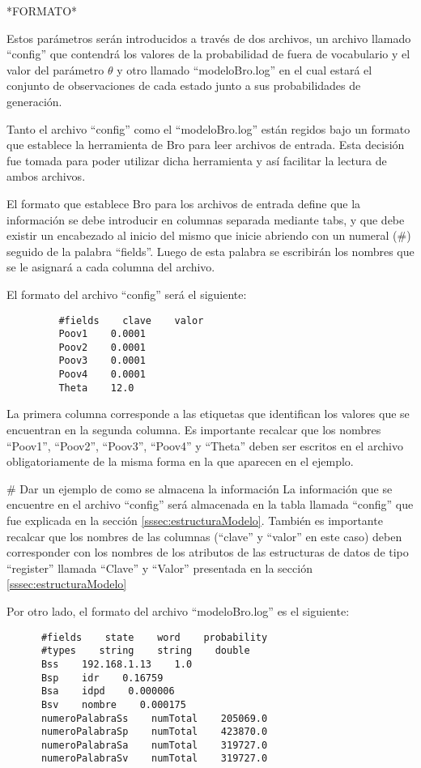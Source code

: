     *FORMATO*

Estos parámetros serán introducidos a través de dos archivos, un archivo llamado “config” que contendrá los valores de la probabilidad de fuera de vocabulario y el valor del parámetro $\theta$ y otro llamado “modeloBro.log” en el cual estará el conjunto de observaciones de cada estado junto a sus probabilidades de generación.

Tanto el archivo “config” como el “modeloBro.log” están regidos bajo un formato que establece la herramienta de Bro para leer archivos de entrada. Esta decisión fue tomada para poder utilizar dicha herramienta y así facilitar la lectura de ambos archivos.

El formato que establece Bro para los archivos de entrada define que la información se debe introducir en columnas separada mediante tabs, y que debe existir un encabezado al inicio del mismo que inicie abriendo con un numeral (\#) seguido de la palabra “fields”. Luego de esta palabra se escribirán los nombres que se le asignará a cada columna del archivo.

El formato del archivo “config” será el siguiente:

\begin{verbatim}
         #fields    clave    valor
         Poov1    0.0001
         Poov2    0.0001
         Poov3    0.0001
         Poov4    0.0001
         Theta    12.0
\end{verbatim}

La primera columna corresponde a las etiquetas que identifican los valores que se encuentran en la segunda columna. Es importante recalcar que los nombres “Poov1”, “Poov2”, “Poov3”, “Poov4” y “Theta” deben ser escritos en el archivo obligatoriamente de la misma forma en la que aparecen en el ejemplo.

\# Dar un ejemplo de como se almacena la información
La información que se encuentre en el archivo “config” será almacenada en  la tabla llamada “config” que fue explicada en la sección \ref{sssec:estructuraModelo}. También es importante recalcar que los nombres de las columnas (“clave” y “valor” en este caso) deben corresponder con los nombres de los atributos de las estructuras de datos de tipo “register” llamada “Clave” y “Valor” presentada en la sección \ref{sssec:estructuraModelo}

Por otro lado, el formato del archivo “modeloBro.log” es el siguiente:

\begin{verbatim}
      #fields    state    word    probability
      #types    string    string    double
      Bss    192.168.1.13    1.0
      Bsp    idr    0.16759
      Bsa    idpd    0.000006
      Bsv    nombre    0.000175
      numeroPalabraSs    numTotal    205069.0
      numeroPalabraSp    numTotal    423870.0
      numeroPalabraSa    numTotal    319727.0
      numeroPalabraSv    numTotal    319727.0
\end{verbatim}


